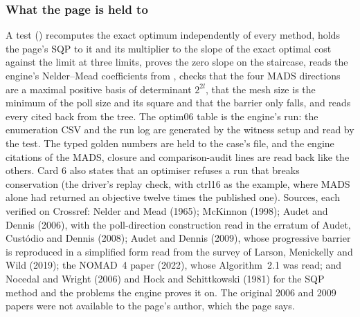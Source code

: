 \documentclass[11pt,a4paper]{article}
\begin{document}
\subsubsection*{What the page is held to}

A test () recomputes the exact optimum
independently of every method, holds the page's SQP to it and its multiplier to
the slope of the exact optimal cost against the limit at three limits, proves
the zero slope on the staircase, reads the engine's Nelder--Mead coefficients
from , checks that the four MADS directions are a maximal
positive basis of determinant $2^{2l}$, that the mesh size is the minimum of
the poll size and its square and that the barrier only falls, and reads
every cited  back from the tree.  The optim06 table is the
engine's run: the enumeration CSV and the run log are generated by the witness
setup and read by the test.  The typed golden numbers are held to the case's
 file, and the engine citations of the MADS, closure and comparison-audit lines are read back like the others.  Card 6 also states that an optimiser refuses a run that breaks conservation (the driver's replay check, with ctrl16 as the example, where MADS alone had returned an objective twelve times the published one).  Sources, each verified on Crossref:
Nelder and Mead (1965); McKinnon (1998); Audet and Dennis (2006), with the
poll-direction construction read in the erratum of Audet, Cust\'odio and
Dennis (2008); Audet and Dennis (2009), whose progressive barrier is
reproduced in a simplified form read from the survey of Larson, Menickelly and
Wild (2019); the NOMAD~4 paper (2022), whose Algorithm~2.1 was read; and
Nocedal and Wright (2006) and Hock and Schittkowski (1981) for the SQP method
and the problems the engine proves it on.  The original 2006 and 2009 papers
were not available to the page's author, which the page says.
\end{document}
